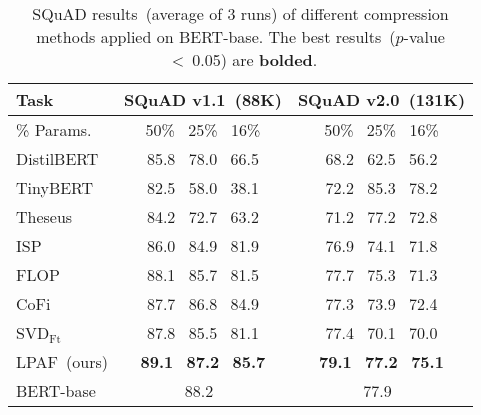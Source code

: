 \begin{table}[t]
	\centering
	\scriptsize
	\begin{tabular}{l|cc}
		\toprule
		Task &\textbf{SQuAD v1.1~(88K) }&\textbf{SQuAD v2.0~(131K)  }                                           \\
		\midrule
		\% Params.   &50\% ~25\%  ~16\% &50\% ~25\%  ~16\%    \\
				\hline
		DistilBERT  &85.8~ 78.0~ 66.5 &68.2~ 62.5~ 56.2    \\
		TinyBERT    &82.5~ 58.0~ 38.1 &72.2~ 85.3~ 78.2         \\
				\hline
		Theseus &84.2~ 72.7~ 63.2 &71.2~ 77.2~ 72.8                                    \\
				\hline
		ISP  &86.0~ 84.9~ 81.9 &76.9~ 74.1~ 71.8                                            \\
		FLOP  &88.1~ 85.7~ 81.5 &77.7~ 75.3~ 71.3                                            \\
		CoFi  &87.7~ 86.8~ 84.9 &77.3~ 73.9~ 72.4                                               \\
		
				\hline
		SVD$_{\text{Ft}}$  &87.8~ 85.5~ 81.1 &77.4~ 70.1~ 70.0     \\
		
		LPAF~(ours)  &\textbf{89.1}~ \textbf{87.2}~ \textbf{85.7} &\textbf{79.1}~ \textbf{77.2}~ \textbf{75.1}  \\
		\midrule
		BERT-base  &~~88.2~~~ &~~77.9~~~  \\
		\bottomrule
	\end{tabular}
	\caption{SQuAD results~(average of 3 runs) of different compression methods applied on BERT-base. The best results~($p$-value ~<~0.05) are \textbf{bolded}.}
	\label{table:squad}
\end{table}
